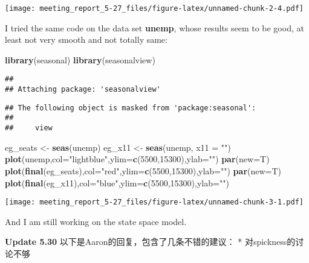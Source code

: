 \documentclass[]{article}
\newenvironment{Shaded}{\begin{snugshade}}{\end{snugshade}}
\newcommand{\DataTypeTok}[1]{\textcolor[rgb]{0.13,0.29,0.53}{#1}}
\newcommand{\DecValTok}[1]{\textcolor[rgb]{0.00,0.00,0.81}{#1}}
\newcommand{\KeywordTok}[1]{\textcolor[rgb]{0.13,0.29,0.53}{\textbf{#1}}}
\newcommand{\NormalTok}[1]{#1}
\newcommand{\StringTok}[1]{\textcolor[rgb]{0.31,0.60,0.02}{#1}}
\begin{document}
\texttt{[image: meeting\_report\_5-27\_files/figure-latex/unnamed-chunk-2-4.pdf]}

I tried the same code on the data set \textbf{unemp}, whose results seem
to be good, at least not very smooth and not totally same:

\begin{Shaded}
\begin{Highlighting}[]
\KeywordTok{library}\NormalTok{(seasonal)}
\KeywordTok{library}\NormalTok{(seasonalview)}
\end{Highlighting}
\end{Shaded}

\begin{verbatim}
## 
## Attaching package: 'seasonalview'
\end{verbatim}

\begin{verbatim}
## The following object is masked from 'package:seasonal':
## 
##     view
\end{verbatim}

\begin{Shaded}
\begin{Highlighting}[]
\NormalTok{eg_seats <-}\StringTok{ }\KeywordTok{seas}\NormalTok{(unemp)}
\NormalTok{eg_x11 <-}\StringTok{ }\KeywordTok{seas}\NormalTok{(unemp, }\DataTypeTok{x11 =} \StringTok{""}\NormalTok{)}
\KeywordTok{plot}\NormalTok{(unemp,}\DataTypeTok{col=}\StringTok{"lightblue"}\NormalTok{,}\DataTypeTok{ylim=}\KeywordTok{c}\NormalTok{(}\DecValTok{5500}\NormalTok{,}\DecValTok{15300}\NormalTok{),}\DataTypeTok{ylab=}\StringTok{""}\NormalTok{)}
\KeywordTok{par}\NormalTok{(}\DataTypeTok{new=}\NormalTok{T)}
\KeywordTok{plot}\NormalTok{(}\KeywordTok{final}\NormalTok{(eg_seats),}\DataTypeTok{col=}\StringTok{"red"}\NormalTok{,}\DataTypeTok{ylim=}\KeywordTok{c}\NormalTok{(}\DecValTok{5500}\NormalTok{,}\DecValTok{15300}\NormalTok{),}\DataTypeTok{ylab=}\StringTok{""}\NormalTok{)}
\KeywordTok{par}\NormalTok{(}\DataTypeTok{new=}\NormalTok{T)}
\KeywordTok{plot}\NormalTok{(}\KeywordTok{final}\NormalTok{(eg_x11),}\DataTypeTok{col=}\StringTok{"blue"}\NormalTok{,}\DataTypeTok{ylim=}\KeywordTok{c}\NormalTok{(}\DecValTok{5500}\NormalTok{,}\DecValTok{15300}\NormalTok{),}\DataTypeTok{ylab=}\StringTok{""}\NormalTok{)}
\end{Highlighting}
\end{Shaded}

\texttt{[image: meeting\_report\_5-27\_files/figure-latex/unnamed-chunk-3-1.pdf]}

And I am still working on the state space model.

\textbf{Update 5.30} 以下是Aaron的回复，包含了几条不错的建议： *
对spickness的讨论不够
\end{document}
